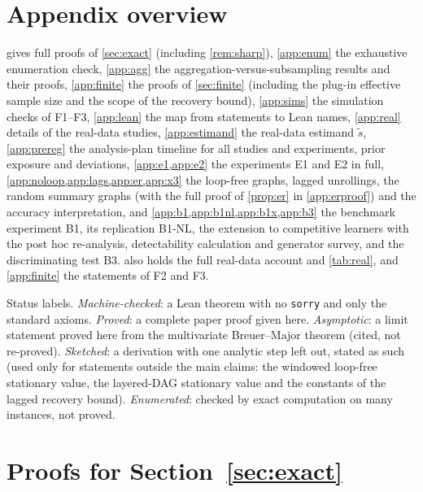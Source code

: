 
\section*{Appendix overview}
 gives full proofs of \cref{sec:exact} (including
\cref{rem:sharp}), \cref{app:enum} the exhaustive enumeration check,
\cref{app:agg} the aggregation-versus-subsampling results and their proofs,
\cref{app:finite} the proofs of \cref{sec:finite} (including the plug-in
effective sample size and the scope of the recovery bound), \cref{app:sims}
the simulation checks of F1--F3, \cref{app:lean} the map from statements to
Lean names, \cref{app:real} details of the real-data studies,
\cref{app:estimand} the real-data estimand $\tilde s$, \cref{app:prereg} the
analysis-plan timeline for all studies and experiments, prior exposure and
deviations, \cref{app:e1,app:e2} the experiments E1 and E2 in full,
\cref{app:noloop,app:lags,app:er,app:x3} the loop-free graphs, lagged
unrollings, the random summary graphs (with the full proof of \cref{prop:er}
in \cref{app:erproof}) and the accuracy interpretation, and
\cref{app:b1,app:b1nl,app:b1x,app:b3} the benchmark experiment B1, its
replication B1-NL, the extension to competitive learners with the post hoc
re-analysis, detectability calculation and generator survey, and the
discriminating test B3.  also holds the full real-data account
and \cref{tab:real}, and \cref{app:finite} the statements of F2 and F3.

Status labels. \emph{Machine-checked}: a Lean theorem with no \texttt{sorry}
and only the standard axioms. \emph{Proved}: a complete paper proof given
here. \emph{Asymptotic}: a limit statement proved here from the multivariate
Breuer--Major theorem \citep{arcones1994limit,nourdin2011quantitative} (cited, not
re-proved). \emph{Sketched}: a derivation with one analytic step left out,
stated as such (used only for statements outside the main claims: the windowed
loop-free stationary value, the layered-DAG stationary value and the constants
of the lagged recovery bound).
\emph{Enumerated}: checked by exact computation on many instances, not proved.

\section{Proofs for Section~\ref{sec:exact}}
\label{app:exact}

